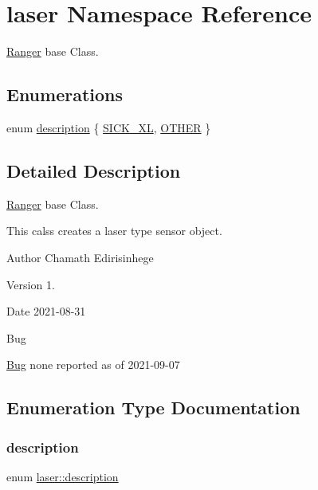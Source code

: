 \hypertarget{namespacelaser}{}\section{laser Namespace Reference}
\label{namespacelaser}


\hyperlink{classRanger}{Ranger} base Class.  


\subsection*{Enumerations}
\begin{DoxyCompactItemize}
\item 
enum \hyperlink{namespacelaser_a986280215cdbdd42579d301afef1d22a}{description} \{ \hyperlink{namespacelaser_a986280215cdbdd42579d301afef1d22aa008f90b010fdf88ec4021779252b67f5}{S\+I\+C\+K\+\_\+\+XL}, 
\hyperlink{namespacelaser_a986280215cdbdd42579d301afef1d22aa59783556f7b2df54071bc3d3a3882988}{O\+T\+H\+ER}
 \}
\end{DoxyCompactItemize}


\subsection{Detailed Description}
\hyperlink{classRanger}{Ranger} base Class. 

This calss creates a laser type sensor object. \begin{DoxyAuthor}{Author}
Chamath Edirisinhege 
\end{DoxyAuthor}
\begin{DoxyVersion}{Version}
1. 
\end{DoxyVersion}
\begin{DoxyDate}{Date}
2021-\/08-\/31 
\end{DoxyDate}
\begin{DoxyRefDesc}{Bug}
\item[\hyperlink{bug__bug000003}{Bug}]none reported as of 2021-\/09-\/07 \end{DoxyRefDesc}


\subsection{Enumeration Type Documentation}
\mbox{\label{namespacelaser_a986280215cdbdd42579d301afef1d22a}} 
\subsubsection{\texorpdfstring{description}{description}}
{\footnotesize\ttfamily enum \hyperlink{namespacelaser_a986280215cdbdd42579d301afef1d22a}{laser\+::description}}

